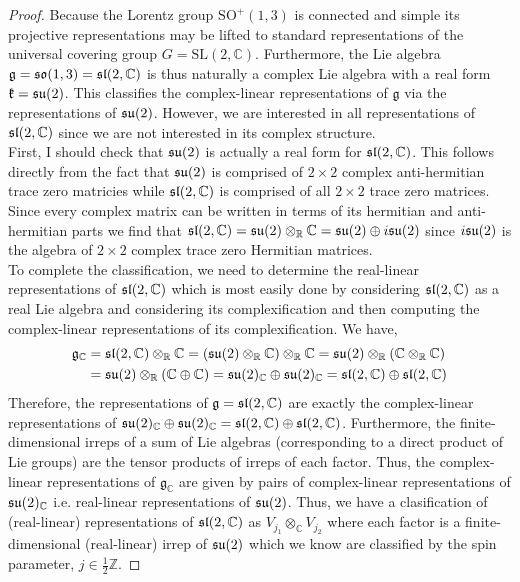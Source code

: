 \documentclass[12pt]{extarticle}
\newcommand{\Z}{\mathbb{Z}}
\newcommand{\R}{\mathbb{R}}
\theoremstyle{definition}
\newcommand{\SL}[1]{\mathrm{SL}\left(#1\right)}
\newcommand{\g}{\mathfrak{g}}
\newcommand{\C}{\mathbb{C}}
\begin{document}
\begin{proof}
Because the Lorentz group $\mathrm{SO}^+(1,3)$ is connected and simple its projective representations may be lifted to standard representations of the universal covering group $G = \SL{2, \C}$. Furthermore, the Lie algebra $\g = \mathfrak{so}(1,3) = \sl(2, \C)$ is thus naturally a complex Lie algebra with a real form $\mathfrak{k} = \mathfrak{su}(2)$. This classifies the complex-linear representations of $\g$ via the representations of $\mathfrak{su}(2)$. However, we are interested in all representations of $\sl(2, \C)$ since we are not interested in its complex structure. 
\bigskip\\
First, I should check that $\mathfrak{su}(2)$ is actually a real form for $\sl(2, \C)$. This follows directly from the fact that $\mathfrak{su}(2)$ is comprised of $2 \times 2$ complex anti-hermitian trace zero matricies while $\sl(2, \C)$ is comprised of all $2 \times 2$ trace zero matrices. Since every complex matrix can be written in terms of its hermitian and anti-hermitian parts we find that $\sl(2, \C) = \su(2) \otimes_\R \C = \su(2) \oplus i \su(2)$ since $i \mathfrak{su}(2)$ is the algebra of $2 \times 2$ complex trace zero Hermitian matrices. 
\bigskip\\
To complete the classification, we need to determine the real-linear representations of $\sl(2, \C)$ which is most easily done by considering $\sl(2, \C)$ as a real Lie algebra and considering its complexification and then computing the complex-linear representations of its complexification. We have,
\begin{align*}
\g_\C & = \sl(2, \C) \otimes_\R \C = (\su(2) \otimes_\R \C) \otimes_\R \C = \su(2) \otimes_\R ( \C \otimes_\R \C) 
\\
& = \su(2) \otimes_\R (\C \oplus \C) = \su(2)_\C \oplus \su(2)_\C = \sl(2, \C) \oplus \sl(2, \C)
\end{align*}  
Therefore, the representations of $\g = \sl(2, \C)$ are exactly the complex-linear representations of $\su(2)_\C \oplus \su(2)_\C = \sl(2, \C) \oplus \sl(2, \C)$. Furthermore, the finite-dimensional irreps of a sum of Lie algebras (corresponding to a direct product of Lie groups) are the tensor products of irreps of each factor. Thus, the complex-linear representations of $\g_\C$ are given by pairs of complex-linear representations of $\su(2)_\C$ i.e. real-linear representations of $\mathfrak{su}(2)$. Thus, we have a clasification of (real-linear) representations  of $\sl(2, \C)$ as $V_{j_1} \otimes_\C V_{j_2}$ where each factor is a finite-dimensional (real-linear) irrep of $\mathfrak{su}(2)$ which we know are classified by the spin parameter,  $j \in \frac{1}{2} \Z$. 
\end{proof}
\end{document}
